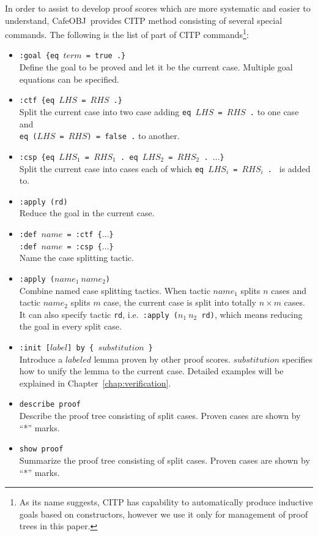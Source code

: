 \documentclass[12pt]{report}
\newcommand{\stt}[1]{{\small{\tt {#1}}}}
\newcommand{\cafeobj}{{\sf CafeOBJ}~}
\begin{document}
In order to assist to develop proof scores which are more systematic
and easier to understand, \cafeobj provides CITP method consisting of
several special commands. The following is the list of part of CITP
commands\footnote{As its name suggests, CITP has capability to
  automatically produce inductive goals based on constructors, however
  we use it only for management of proof trees in this paper.}:
\begin{itemize}
\item \stt{:goal \{eq $term$ = true .\}}\\ Define the goal to be
  proved and let it be the current case. Multiple goal equations
  can be specified.
\item \stt{:ctf \{eq $LHS$ = $RHS$ .\}}\\
  Split the current case into two case adding \stt{eq~$LHS$~=~$RHS$~.} to one case and\\
  \stt{eq~($LHS$~=~$RHS$)~=~false~.} to another.
\item \stt{:csp \{eq $LHS_1$ = $RHS_1$ . eq $LHS_2$ = $RHS_2$ . $\dots$\}}\\
  Split the current case into cases each of which
  \stt{eq~$LHS_i$~=~$RHS_i$~.~} is added to.
\item \stt{:apply (rd)}\\
 Reduce the goal in the current case.
\item \stt{:def $name$ = :ctf \{$\dots$\}}\\
  \stt{:def $name$ = :csp \{$\dots$\}}\\
  Name the case splitting tactic.
\item \stt{:apply ($name_1\ name_2$)}\\ 
  Combine named case splitting tactics. When tactic $name_1$ splits
  $n$ cases and tactic $name_2$ splits $m$ case, the current case is
  split into totally $n\times m$ cases.  It can also specify tactic
  {\tt rd}, i.e.\ \stt{:apply~($n_1\ n_2$~rd)}, which means reducing
  the goal in every split case.
\item \stt{:init [$label$] by \{ $substitution$ \}}\\
  Introduce a $labeled$ lemma proven by other proof scores. $substitution$ specifies
  how to unify the lemma to the current case. Detailed examples will be explained
  in Chapter~\ref{chap:verification}.
\item \stt{describe proof}\\
 Describe the proof tree consisting of split cases. Proven cases are shown by ``*'' marks.
\item \stt{show proof}\\
Summarize the proof tree consisting of split cases. Proven cases are shown by ``*'' marks.
\end{itemize}
\end{document}
